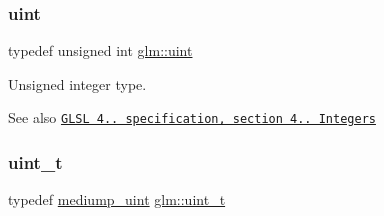 \subsubsection{\texorpdfstring{uint}{uint}}
{\footnotesize\ttfamily typedef unsigned int \mbox{\hyperlink{group__core__precision_ga4fd29415871152bfb5abd588334147c8}{glm\+::uint}}}

Unsigned integer type.

\begin{DoxySeeAlso}{See also}
\href{http://www.opengl.org/registry/doc/GLSLangSpec.4.20.8.pdf}{\tt G\+L\+SL 4.. specification, section 4.. Integers} 
\end{DoxySeeAlso}
\mbox{\label{group__core__precision_ga5f2ae871c284c9d39ae8fdbb1305b566}} 
\subsubsection{\texorpdfstring{uint\+\_\+t}{uint\_t}}
{\footnotesize\ttfamily typedef \mbox{\hyperlink{group__core__precision_ga08ae38ad78ade3539fdd1d25052b8c51}{mediump\+\_\+uint}} \mbox{\hyperlink{group__core__precision_ga5f2ae871c284c9d39ae8fdbb1305b566}{glm\+::uint\+\_\+t}}}

